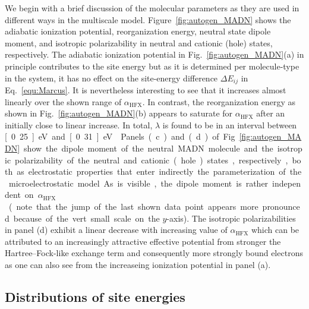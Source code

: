 \documentclass[%
 reprint,
superscriptaddress,
 amsmath,amssymb,
 aps,
prb,
floatfix
]{revtex4-2}
\newcommand{\bjoern}[2]{{\color{blue}{{\bf #1} #2}}}
\newcommand{\ahfx}{\ensuremath{\alpha_\text{HFX}}\xspace}
\begin{document}
We begin with a brief discussion of the molecular parameters as they are used in different ways in the multiscale model. Figure~\ref{fig:autogen_MADN} shows the adiabatic ionization potential, reorganization energy, neutral state dipole moment, and isotropic polarizability in neutral and cationic (hole) states, respectively. The adiabatic ionization potential in Fig.~\ref{fig:autogen_MADN}(a) in principle contributes to the site energy but as it is determined per molecule-type in the system, it has no effect on the site-energy difference $\Delta E_{ij}$ in Eq.~\ref{equ:Marcus}. It is nevertheless interesting to see that it increases almost linearly over the shown range of \ahfx. In contrast, the reorganization energy as shown in Fig.~\ref{fig:autogen_MADN}(b) appears to saturate for \ahfx after an initially close to linear increase. In total, $\lambda$ is found to be in an interval between \unit[0.25]{eV} and \unit[0.31]{eV} \bjoern{need}{correct numbers here}. Panels (c) and (d) of Fig.~\ref{fig:autogen_MADN} show the dipole moment of the neutral MADN molecule and the isotropic polarizability of the neutral and cationic (hole) states, respectively, both as electrostatic properties that enter indirectly the parameterization of the microelectrostatic model. As is visible, the dipole moment is rather independent on \ahfx (note that the jump of the last shown data point appears more pronounced because of the vert small scale on the $y$-axis). The isotropic polarizabilities in panel (d) exhibit a linear decrease with increasing value of \ahfx which can be attributed to an increasingly attractive effective potential from stronger the Hartree--Fock-like exchange term and consequently more strongly bound electrons as one can also see from the increaseing ionization potential in panel (a).  

\subsection{Distributions of site energies}

\bjoern{STOP}{HERE}
\end{document}
